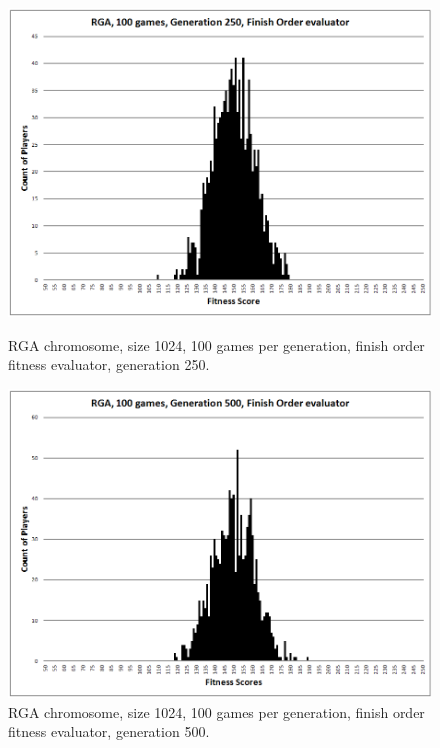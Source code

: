 \begin{figure}
\centering
\begin{minipage}[t]{0.47\linewidth}
\centering
\includegraphics[width=1.0\linewidth]{Figures/RGA_1024_G250_N100_FO.png}
\caption[RGA Fitness Distribution, 250th Generation]{RGA chromosome, size 1024,
100 games per generation, finish order fitness evaluator, generation
250.}
\label{figure-RGA-250th_gen_fitness}
\end{minipage}%
\hspace{0.06\linewidth}%
\begin{minipage}[t]{0.47\linewidth}
\centering
\includegraphics[width=1.0\linewidth]{Figures/RGA_1024_G500_N100_FO.png}
\caption[RGA Fitness Distribution, 500th Generation]{RGA chromosome, size 1024,
100 games per generation, finish order fitness evaluator, generation
500.}
\label{figure-RGA-500th_gen_fitness}
\end{minipage}


\end{figure}

